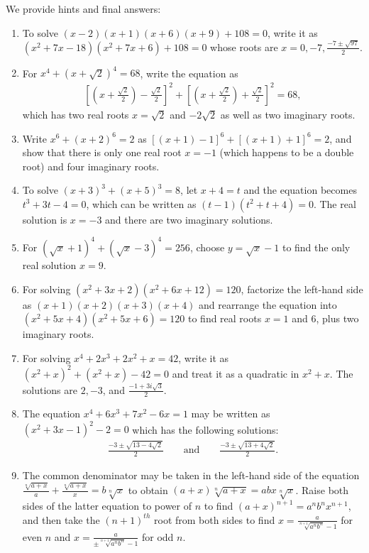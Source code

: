 \documentclass[12pt,a4paper]{memoir}
\theoremstyle{definition}
\begin{document}
\begin{solution}
	We provide hints and final answers:
	\begin{enumerate}
		\item To solve $(x-2)(x+1)(x+6)(x+9)+108 = 0$, write it as $(x^2+7x-18)(x^2+7x+6)+108=0$ whose roots are $x=0,-7,\displaystyle\frac{-7\pm \sqrt{97}}{2}$.
		\item For $x^4 + (x+\sqrt 2)^4 = 68$, write the equation as
		\begin{align*}
			\left[\left(x+\frac{\sqrt{2}}{2}\right) - \frac{\sqrt{2}}{2}\right]^2 + \left[\left(x+\frac{\sqrt{2}}{2}\right) + \frac{\sqrt{2}}{2}\right]^2 = 68,
		\end{align*}
		which has two real roots $x=\sqrt 2$ and $-2\sqrt 2$ as well as two imaginary roots.
		\item Write $x^6 + (x+2)^6 = 2$ as $[(x+1)-1]^6 + [(x+1)+1]^6 = 2$, and show that there is only one real root $x=-1$ (which happens to be a double root) and four imaginary roots.
		\item To solve $(x+3)^3+(x+5)^3=8$, let $x+4=t$ and the equation becomes $t^3+3t-4=0$, which can be written as $(t-1)(t^2+t+4)=0$. The real solution is $x=-3$ and there are two imaginary solutions.
		\item For $(\sqrt x + 1)^4 + (\sqrt x - 3)^4 = 256$, choose $y=\sqrt x - 1$ to find the only real solution $x=9$.
		\item For solving $(x^2+3x+2)(x^2+6x+12)=120$, factorize the left-hand side as $(x+1)(x+2)(x+3)(x+4)$ and rearrange the equation into $(x^2+5x+4)(x^2+5x+6)=120$ to find real roots $x=1$ and $6$, plus two imaginary roots.
		\item For solving $x^4+2x^3+2x^2+x=42$, write it as $(x^2+x)^2+(x^2+x)-42=0$ and treat it as a quadratic in $x^2+x$. The solutions are $2, -3$, and $\displaystyle \frac{-1+3i\sqrt{3}}{2}$.
		\item The equation $x^4+6x^3+7x^2-6x=1$ may be written as $(x^2+3x-1)^2 - 2=0$ which has the following solutions:
		\begin{align*}
			\frac{-3\pm \sqrt{13-4\sqrt{2}}}{2} \qquad \text{and} \qquad \frac{-3\pm \sqrt{13+4\sqrt{2}}}{2}.
		\end{align*}
		\item The common denominator may be taken in the left-hand side of the equation $\displaystyle \frac{\sqrt[n]{a+x}}{a} + \frac{\sqrt[n]{a+x}}{x} = b\sqrt[n]{x}$ to obtain $(a+x)\sqrt[n]{a+x}=abx\sqrt[n]{x}$. Raise both sides of the latter equation to power of $n$ to find $(a+x)^{n+1} = a^n b^n x^{n+1}$, and then take the $(n+1)^{th}$ root from both sides to find $x=\displaystyle\frac{a}{\sqrt[n+1]{a^nb^n}-1}$ for even $n$ and $x=\displaystyle\frac{a}{\pm\sqrt[n+1]{a^nb^n}-1}$ for odd $n$.

\end{enumerate}
\end{solution}
\end{document}
